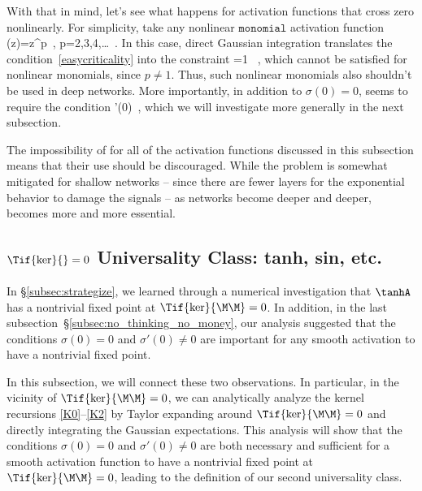 With that in mind, let's see what happens for activation functions that cross zero nonlinearly.
For simplicity, take any nonlinear $\texttt{monomial}$ activation function  
\be
\sigma(z)=z^p\, ,  \quad p=2,3,4,\ldots\, .
\ee
In this case, direct Gaussian integration translates the condition~\eqref{easycriticality}  into the constraint
\be
{}=1 \, ,
\ee
which cannot be satisfied for nonlinear monomials, since $p\ne 1$. Thus, such nonlinear monomials also shouldn't be used in deep networks.
More importantly, in addition to $\sigma(0)=0$,  seems to require
the condition
\be
\sigma'(0)\, ,
\ee
which we will investigate more generally in the next subsection.

The impossibility of  for all of the activation functions discussed in this subsection means that their use should be discouraged. While the problem is somewhat mitigated for shallow networks -- since there are fewer layers for the exponential behavior to damage the signals -- as networks become deeper and deeper,  becomes more and more essential.











\subsection{\texorpdfstring{$\Tif{\ker}{}=0$}{K*=0} Universality Class: tanh, sin, etc.}\label{subsec:tanh_univ}

In \S\ref{subsec:strategize},  we learned through a numerical investigation that $\tanhA$ has a nontrivial fixed point at $\Tif{\ker}{\M\M}=0$. In addition, in the last subsection~\S\ref{subsec:no_thinking_no_money}, 
our analysis suggested
that the conditions $\sigma(0)=0$ and $\sigma'(0)\ne 0$ are %
important %
for any smooth activation to have a nontrivial fixed point. 

In this subsection, we will connect these two observations.
In particular,  in the vicinity of $\Tif{\ker}{\M\M}=0$, we can analytically analyze the kernel recursions \eqref{K0}--\eqref{K2} by Taylor expanding around $\Tif{\ker}{\M\M}=0$ and directly integrating the Gaussian expectations. This analysis will show that the conditions $\sigma(0)=0$ and $\sigma'(0)\ne 0$ are both necessary and sufficient for a smooth activation function to have a nontrivial fixed point at $\Tif{\ker}{\M\M}=0$, leading to the definition of our second universality class.



